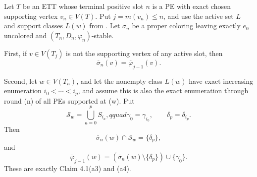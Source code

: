 \begin{lemma}
Let \(T\) be an ETT whose terminal positive slot \(n\) is a PE with
exact chosen supporting vertex \(v_n\in V(T)\).  Put
\(j=m(v_n)\leq n\), and use the active set \(L\) and support classes
\(L(w)\) from .  Let \(\sigma_n\) be
a proper coloring leaving exactly \(e_0\) uncolored and
\((T_n,D_n,\varphi_n)\)-stable.

First, if \(v\in V(T_j)\) is not the supporting vertex of any active
slot, then
\[
                    \overline\sigma_n(v)
                    =\overline\varphi_{j-1}(v).                \tag{1}
\]

Second, let \(w\in V(T_n)\), and let the nonempty class \(L(w)\) have
exact increasing enumeration
\(i_0<\cdots<i_p\), and assume this is also the exact enumeration through
round (n) of all PEs supported at (w).  Put
\[
 \mathcal S_w=\bigcup_{a=0}^{p}S_{i_a},qquad
 \gamma_0=\gamma_{i_0},\qquad \delta_p=\delta_{i_p}.
\]
Then
\[
 \overline\sigma_n(w)\cap\mathcal S_w=\{\delta_p\},            \tag{2}
\]
and
\[
 \overline\varphi_{j-1}(w)
   =(\overline\sigma_n(w)\setminus\{\delta_p\})
       \cup\{\gamma_0\}.                                     \tag{3}
\]
These are exactly Claim 4.1(a3) and (a4).
\end{lemma}

